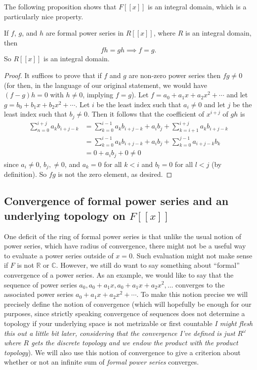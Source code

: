 The following proposition shows that $F[[x]]$ is an integral domain, which is a particularly nice property.
\begin{theorem}
If $f$, $g$, and $h$ are formal power series in $R[[x]]$, where $R$ is an integral domain, then 
\[fh = gh \implies f = g.\]
So $R[[x]]$ is an integral domain.
\end{theorem}
\begin{proof}
It suffices to prove that if $f$ and $g$ are non-zero power series then $fg \neq 0$ (for then, in the language of our original statement, we would have $(f-g)h = 0$ with $h \neq 0$, implying $f = g$). Let $f = a_0 + a_1x + a_2x^2 + \cdots$ and let $g = b_0 + b_1x + b_2x^2 + \cdots$. Let $i$ be the least index such that $a_i \neq 0$ and let $j$ be the least index such that $b_j \neq 0$. Then it follows that the coefficient of $x^{i + j}$ of $gh$ is
\begin{align*}
	\sum_{n = 0}^{i + j}a_kb_{i + j - k} &= \sum_{k = 0}^{i - 1}a_kb_{i + j - k} + a_ib_j + \sum_{k = i + 1}^{i + j}a_kb_{i + j - k} \\
	&= \sum_{k = 0}^{i - 1}a_kb_{i + j - k} + a_ib_j + \sum_{k = 0}^{j - 1}a_{i + j - k}b_k \\
&= 0 + a_ib_j + 0 \neq 0
\end{align*}
since $a_i \neq 0$, $b_j, \neq 0$, and $a_k = 0$ for all $k < i$ and $b_l = 0$ for all $l < j$ (by definition). So $fg$ is not the zero element, as desired.
\end{proof}

\subsection{Convergence of formal power series and an underlying topology on $F[[x]]$}

One deficit of the ring of formal power series is that unlike the usual notion of power series, which have radius of convergence, there might not be a useful way to evaluate a power series outside of $x = 0$. Such evaluation might not make sense if $F$ is not $\mathbb{R}$ or $\mathbb{C}$. However, we still do want to say something about ``formal'' convergence of a power series. As an example, we would like to say that the sequence of power series $a_0, a_0 + a_1x, a_0 + a_1x + a_2x^2, \dots$ converges to the associated power series $a_0 + a_1x + a_2x^2 + \cdots$. To make this notion precise we will precisely define the notion of convergence (which will hopefully be enough for our purposes, since strictly speaking convergence of sequences does not determine a topology if your underlying space is not metrizable or first countable \textit{I might flesh this out a little bit later, considering that the convergence I've defined is just $R^{\omega}$ where $R$ gets the discrete topology and we endow the product with the product topology}). We will also use this notion of convergence to give a criterion about whether or not an infinite sum of \textit{formal power series} converges. 

